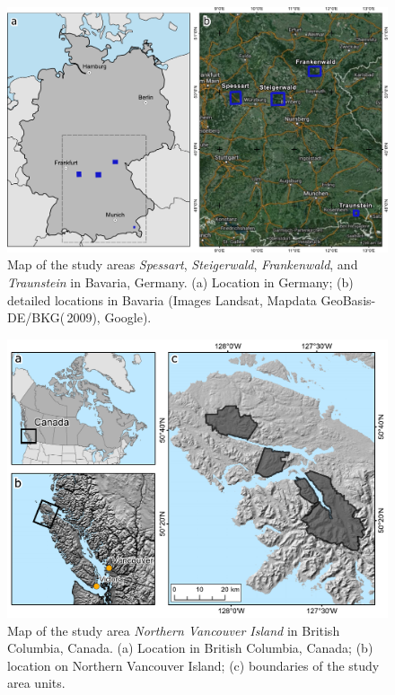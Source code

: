 \begin{figure}[h]
	\centering
	\includegraphics[width=1\textwidth]{Figures/TestSites/Bavaria/TestSites_BY_2} %
	\caption[Map of the study areas in Bavaria.]{Map of the study areas \emph{Spessart}, \emph{Steigerwald}, \emph{Frankenwald}, 
		and \emph{Traunstein} in Bavaria, Germany. (a) Location in Germany; (b) detailed locations in Bavaria 
		(Images \textcopyright Landsat, Mapdata \textcopyright
		GeoBasis-DE/BKG(\textcopyright\,2009), Google).}
	\label{fig:TestSites_BY}
\end{figure}

\begin{figure}[!h]
	\centering
	\includegraphics[width=.9\textwidth]{Figures/TestSites/NVI/wfp_BritishColumbia_testSite} %
	\caption[Map of the study area in British Columbia.]{Map of the study area \emph{Northern Vancouver Island} in 
		British Columbia, Canada. (a) Location in British Columbia, Canada;
		(b) location on \mbox{Northern} Vancouver Island; (c) boundaries of the study area units.}
	\label{fig:TestSite_NVI}
\end{figure}


